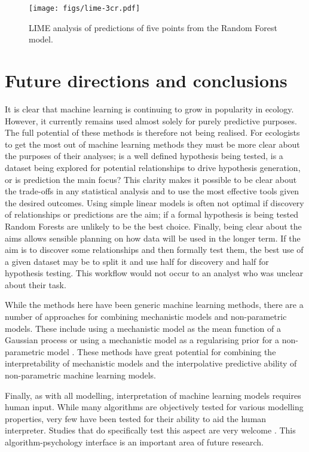 \documentclass[10pt,]{article}
\begin{document}
\begin{figure}[t!]
\centering
\texttt{[image: figs/lime-3cr.pdf]}
\caption{LIME analysis of predictions of five points from the Random Forest model.\protect\label{fig:limerf}}
\end{figure}

\section{Future directions and conclusions}\label{future-directions-and-conclusions}

It is clear that machine learning is continuing to grow in popularity in ecology.
However, it currently remains used almost solely for purely predictive purposes.
The full potential of these methods is therefore not being realised.
For ecologists to get the most out of machine learning methods they must be more clear about the purposes of their analyses; is a well defined hypothesis being tested, is a dataset being explored for potential relationships to drive hypothesis generation, or is prediction the main focus?
This clarity makes it possible to be clear about the trade-offs in any statistical analysis and to use the most effective tools given the desired outcomes.
Using simple linear models is often not optimal if discovery of relationships or predictions are the aim; if a formal hypothesis is being tested Random Forests are unlikely to be the best choice.
Finally, being clear about the aims allows sensible planning on how data will be used in the longer term.
If the aim is to discover some relationships and then formally test them, the best use of a given dataset may be to split it and use half for discovery and half for hypothesis testing.
This workflow would not occur to an analyst who was unclear about their task.

While the methods here have been generic machine learning methods, there are a number of approaches for combining mechanistic models and non-parametric models.
These include using a mechanistic model as the mean function of a Gaussian process \citep{rasmussen2004gaussian} or using a mechanistic model as a regularising prior for a non-parametric model \citep{lyddon2018nonparametric}.
These methods have great potential for combining the interpretability of mechanistic models and the interpolative predictive ability of non-parametric machine learning models.

Finally, as with all modelling, interpretation of machine learning models requires human input.
While many algorithms are objectively tested for various modelling properties, very few have been tested for their ability to aid the human interpreter.
Studies that do specifically test this aspect are very welcome \citep{bastani2017interpreting}.
This algorithm-psychology interface is an important area of future research.
\end{document}
